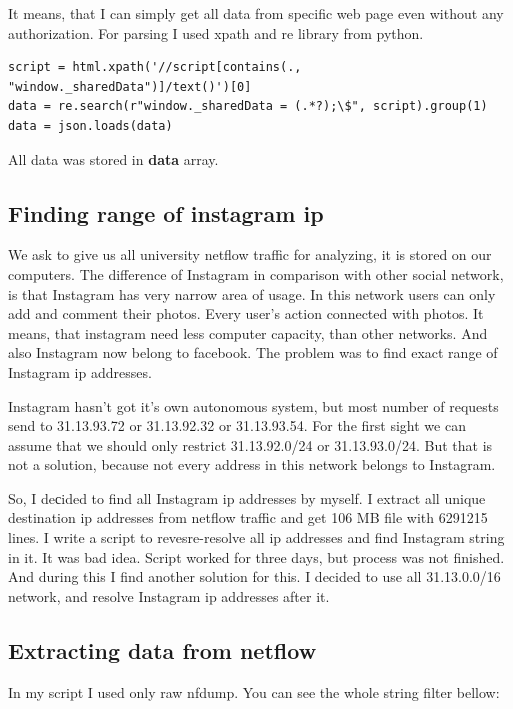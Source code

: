 It means, that I can simply get all data from specific web page even without any authorization. For parsing I used xpath and re library from python. 

\begin{lstlisting}
script = html.xpath('//script[contains(., "window._sharedData")]/text()')[0]
data = re.search(r"window._sharedData = (.*?);\$", script).group(1)
data = json.loads(data)
\end{lstlisting}

All data was stored in \textbf{data} array.

\subsection{Finding range of instagram ip}

We ask to give us all university netflow traffic for analyzing, it is stored on our computers. The difference of Instagram in comparison with other social network, is that Instagram has very narrow area of usage. In this network users can only add and comment their photos. Every user’s action connected with photos. It means, that instagram need less computer capacity, than other networks. And also Instagram now belong to facebook. The problem was to find exact range of Instagram ip addresses. 

Instagram hasn’t got it’s own autonomous system, but most number of requests send to 31.13.93.72 or 31.13.92.32 or 31.13.93.54. For the first sight we can assume that we should only restrict 31.13.92.0/24 or 31.13.93.0/24. But that is not a solution, because not every address in this network belongs to Instagram.

So, I deсided to find all Instagram ip addresses by myself. I extract all unique destination ip addresses from netflow traffic and get 106 MB file with 6291215 lines. I write a script to revesre-resolve all ip addresses and find Instagram string in it. It was bad idea. Script worked for three days, but process was not finished. And during this I find another solution for this. I decided to use all 31.13.0.0/16 network, and resolve Instagram ip addresses after it.

\subsection{Extracting data from netflow}

In my script I used only raw nfdump. You can see the whole string filter bellow:

